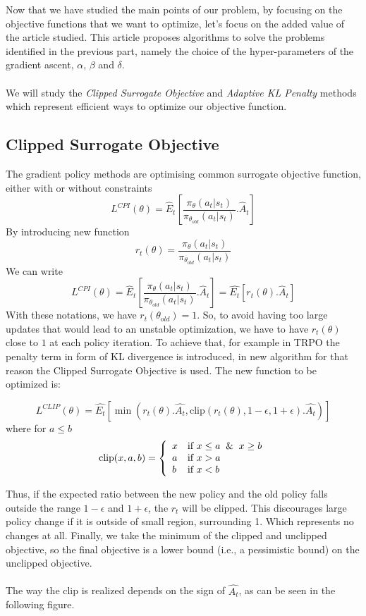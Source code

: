 \documentclass{article}
\begin{document}
Now that we have studied the main points of our problem, by focusing on the objective functions that we want to optimize, let's focus on the added value of the article studied. This article proposes algorithms to solve the problems identified in the previous part, namely the choice of the hyper-parameters of the gradient ascent, $\alpha$, $\beta$ and $\delta$.
\\
\\
We will study the \textit{Clipped Surrogate Objective} and \textit{Adaptive KL Penalty} methods which represent efficient ways to optimize our objective function.
\subsection{Clipped Surrogate Objective}
The gradient policy methods are optimising common surrogate objective function, either with or without constraints
$$
L^{CPI}(\theta) = \hat{E}_{t}\left[\frac{\pi_{\theta}(a_t|s_t)}{\pi_{\theta_{old}}(a_t|s_t)} .\hat{A}_t\right]
$$
By introducing new function
$$
r_t(\theta) = \frac{\pi_{\theta}(a_t|s_t)}{\pi_{\theta_{old}}(a_t|s_t)}
$$
We can write
$$ 
 L^{CPI}(\theta) = \hat{E}_{t}\left[\frac{\pi_{\theta}(a_t|s_t)}{\pi_{\theta_{old}}(a_t|s_t)} .\hat{A}_t\right] = \hat{E_{t}}[r_t(\theta) .\hat{A}_t] 
$$
With these notations, we have $r_t(\theta_{old}) = 1$. So, to avoid having too large updates that would lead to an unstable optimization, we have to have $r_t(\theta)$ close to $1$ at each policy iteration. To achieve that, for example in TRPO the penalty term in form of KL divergence is introduced, in new algorithm for that reason the Clipped Surrogate Objective is used. The new function to be optimized is: 

$$
L^{CLIP}(\theta) = \hat{E_{t}}\left[\min(r_t(\theta) .\hat{A_t}, \text{clip}(r_t(\theta), 1-\epsilon, 1+\epsilon).\hat{A_t})\right]
$$
where for $a \leq b$
$$
\text{clip}(x,a,b) = 
\left\{ 
    \begin{array}{ll}
        x & \mbox{if } x \leq a \And x \geq b \\
        a  & \mbox{if } x > a   \\
        b  & \mbox{if } x < b
    \end{array}
\right.
$$

Thus, if the expected ratio between the new policy and the old policy falls outside the range $1 - \epsilon$ and $1 + \epsilon$, the $r_t$ will be clipped.  This discourages large policy change if it is outside of small region, surrounding 1. Which represents no changes at all. Finally, we take the minimum of the clipped and unclipped objective, so the
final objective is a lower bound (i.e., a pessimistic bound) on the unclipped objective.
\\
\\
The way the clip is realized depends on the sign of $\hat{A_t}$, as can be seen in the following figure. 
\end{document}
